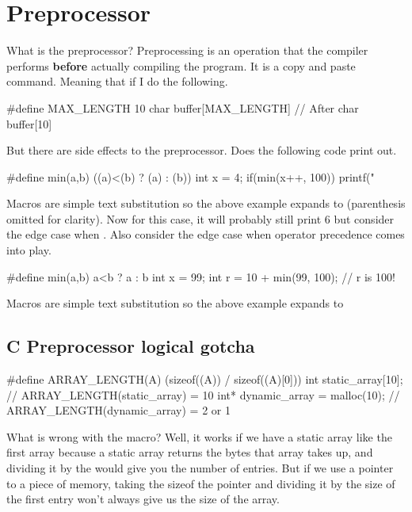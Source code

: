 \section{Preprocessor}

What is the preprocessor? Preprocessing is an operation that the compiler performs \textbf{before} actually compiling the program. It is a copy and paste command. Meaning that if I do the following.

\begin{code}[language=C]
#define MAX_LENGTH 10
char buffer[MAX_LENGTH]
// After
char buffer[10]
\end{code}

But there are side effects to the preprocessor. Does the following code print out.

\begin{code}[language=C]
#define min(a,b) ((a)<(b) ? (a) : (b))
int x = 4;
if(min(x++, 100)) printf("%
\end{code}

Macros are simple text substitution so the above example expands to  (parenthesis omitted for clarity). Now for this case, it will probably still print 6 but consider the edge case when . Also consider the edge case when operator precedence comes into play.

\begin{code}[language=C]
#define min(a,b) a<b ? a : b
int x = 99;
int r = 10 + min(99, 100); // r is 100!
\end{code}

Macros are simple text substitution so the above example expands to 

\subsection{C Preprocessor logical gotcha}\label{c-preprocessor-logical-gotcha}

\begin{code}[language=C]
#define ARRAY_LENGTH(A) (sizeof((A)) / sizeof((A)[0]))
int static_array[10]; // ARRAY_LENGTH(static_array) = 10
int* dynamic_array = malloc(10); // ARRAY_LENGTH(dynamic_array) = 2 or 1
\end{code}

What is wrong with the macro? Well, it works if we have a static array like the first array because  a static array returns the bytes that array takes up, and dividing it by the  would give you the number of entries. But if we use a pointer to a piece of memory, taking the sizeof the pointer and dividing it by the size of the first entry won't always give us the size of the array.

